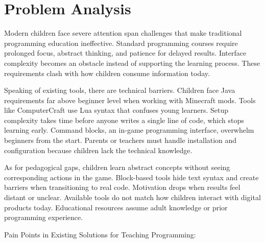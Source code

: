 \section{Problem Analysis}

Modern children face severe attention span challenges that make traditional programming education ineffective.
Standard programming courses require prolonged focus, abstract thinking, and patience for delayed results. 
Interface complexity becomes an obstacle instead of supporting the learning process. These requirements clash with how children consume information today. 

Speaking of existing tools, there are technical barriers. Children face Java requirements far above beginner level when working with Minecraft mods. 
Tools like ComputerCraft use Lua syntax that confuses young learners. 
Setup complexity takes time before anyone writes a single line of code, which stops learning early. 
Command blocks, an in-game programming interface, overwhelm beginners from the start. 
Parents or teachers must handle installation and configuration because children lack the technical knowledge.

As for pedagogical gaps, children learn abstract concepts without seeing corresponding actions in the game. 
Block-based tools hide text syntax and create barriers when transitioning to real code. 
Motivation drops when results feel distant or unclear. 
Available tools do not match how children interact with digital products today. 
Educational resources assume adult knowledge or prior programming experience.

Pain Points in Existing Solutions for Teaching Programming:

